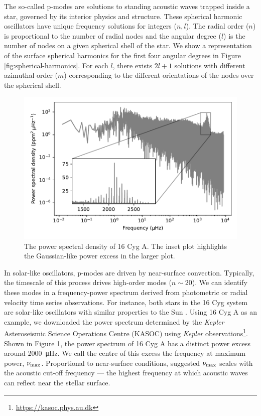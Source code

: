 The so-called p-modes are solutions to standing acoustic waves trapped inside a star, governed by its interior physics and structure. These spherical harmonic oscillators have unique frequency solutions for integers (\(n, l\)). The radial order (\(n\)) is proportional to the number of radial nodes and the angular degree (\(l\)) is the number of nodes on a given spherical shell of the star. We show a representation of the surface spherical harmonics for the first four angular degrees in Figure \ref{fig:spherical-harmonics}. For each \(l\), there exists \(2l+1\) solutions with different azimuthal order (\(m\)) corresponding to the different orientations of the nodes over the spherical shell.

\begin{figure}[tb]
    \centering
    \includegraphics{figures/seismo-psd.pdf}
    \caption{The power spectral density of 16 Cyg A. The inset plot highlights the Gaussian-like power excess in the larger plot.}
    \label{fig:seismo-psd}
\end{figure}

In solar-like oscillators, p-modes are driven by near-surface convection. Typically, the timescale of this process drives high-order modes (\(n \sim 20\)). We can identify these modes in a frequency-power spectrum derived from photometric or radial velocity time series observations. For instance, both stars in the 16 Cyg system are solar-like oscillators with similar properties to the Sun \needcite. Using 16 Cyg A as an example, we downloaded the power spectrum determined by the \emph{Kepler} Asteroseismic Science Operations Centre (KASOC) using \emph{Kepler} observations\footnote{\url{https://kasoc.phys.au.dk}}. Shown in Figure \ref{fig:seismo-psd}, the power spectrum of 16 Cyg A has a distinct power excess around \SI{2000}{\micro\hertz}. We call the centre of this excess the frequency at maximum power, \({\nu_\mathrm{max}}\). Proportional to near-surface conditions, \citet{Brown.Gilliland.ea1991} suggested \({\nu_\mathrm{max}}\) scales with the acoustic cut-off frequency --- the highest frequency at which acoustic waves can reflect near the stellar surface.

